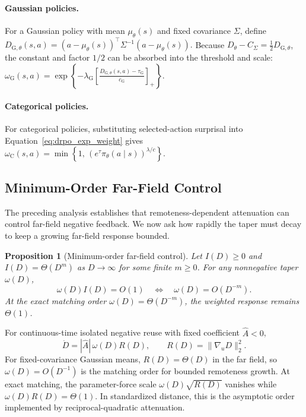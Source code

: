 \documentclass{article}
\theoremstyle{plain}
\newtheorem{proposition}[theorem]{Proposition}
\theoremstyle{definition}
\theoremstyle{remark}
\begin{document}
\paragraph{Gaussian policies.}
For a Gaussian policy with mean \(\mu_\theta(s)\) and fixed covariance
\(\Sigma\), define
\(
    D_{\mathrm G,\theta}(s,a)
    =
    (a-\mu_\theta(s))^\top
    \Sigma^{-1}
    (a-\mu_\theta(s)).
\)
Because \(D_\theta-C_\Sigma=\frac12D_{\mathrm G,\theta}\), the constant
and factor \(1/2\) can be absorbed into the threshold and scale:
\(
    \omega_{\mathrm G}(s,a)
    =
    \exp
    \left\{
        -\lambda_{\mathrm G}
        \left[
            \frac{D_{\mathrm G,\theta}(s,a)-\tau_{\mathrm G}}
                 {c_{\mathrm G}}
        \right]_{+}
    \right\}.
\)

\paragraph{Categorical policies.}
For categorical policies, substituting selected-action surprisal into
Equation~\eqref{eq:drpo_exp_weight} gives
\(
    \omega_{\mathrm C}(s,a)
    =
    \min
    \left\{
        1,\,
        \left(e^{\tau}\pi_\theta(a\mid s)\right)^{\lambda/c}
    \right\}.
\)
\subsection{Minimum-Order Far-Field Control}
\label{subsec:min_order_control}

The preceding analysis establishes that remoteness-dependent attenuation can
control far-field negative feedback. We now ask how rapidly the taper must
decay to keep a growing far-field response bounded.

\begin{proposition}[Minimum-order far-field control]
\label{prop:min_order_control}
Let \(I(D)\geq0\) and \(I(D)=\Theta(D^m)\) as \(D\to\infty\) for some
finite \(m\geq0\). For any nonnegative taper \(\omega(D)\),
\[
    \omega(D)I(D)=O(1)
    \quad\Longleftrightarrow\quad
    \omega(D)=O(D^{-m}).
\]
At the exact matching order
\(\omega(D)=\Theta(D^{-m})\), the weighted response remains
\(\Theta(1)\).
\end{proposition}

For continuous-time isolated negative reuse with fixed coefficient
\(\widehat A<0\),
\[
    \dot D
    =
    |\widehat A|\,\omega(D)R(D),
    \qquad
    R(D)=\|\nabla_u D\|_2^2.
\]
For fixed-covariance Gaussian means, \(R(D)=\Theta(D)\) in the far field, so
\(\omega(D)=O(D^{-1})\) is the matching order for bounded remoteness growth.
At exact matching, the parameter-force scale
\(\omega(D)\sqrt{R(D)}\) vanishes while
\(\omega(D)R(D)=\Theta(1)\).
In standardized distance, this is the asymptotic order implemented by
reciprocal-quadratic attenuation.
\end{document}
